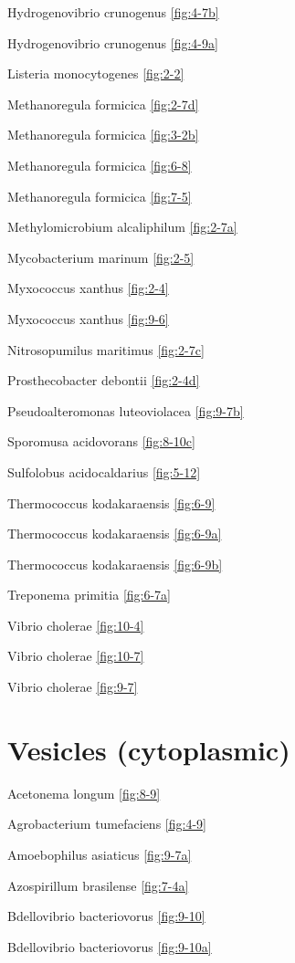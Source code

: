 \documentclass[]{tufte-book}
\begin{document}
Hydrogenovibrio crunogenus \ref{fig:4-7b}

Hydrogenovibrio crunogenus \ref{fig:4-9a}

Listeria monocytogenes \ref{fig:2-2}

Methanoregula formicica \ref{fig:2-7d}

Methanoregula formicica \ref{fig:3-2b}

Methanoregula formicica \ref{fig:6-8}

Methanoregula formicica \ref{fig:7-5}

Methylomicrobium alcaliphilum \ref{fig:2-7a}

Mycobacterium marinum \ref{fig:2-5}

Myxococcus xanthus \ref{fig:2-4}

Myxococcus xanthus \ref{fig:9-6}

Nitrosopumilus maritimus \ref{fig:2-7c}

Prosthecobacter debontii \ref{fig:2-4d}

Pseudoalteromonas luteoviolacea \ref{fig:9-7b}

Sporomusa acidovorans \ref{fig:8-10c}

Sulfolobus acidocaldarius \ref{fig:5-12}

Thermococcus kodakaraensis \ref{fig:6-9}

Thermococcus kodakaraensis \ref{fig:6-9a}

Thermococcus kodakaraensis \ref{fig:6-9b}

Treponema primitia \ref{fig:6-7a}

Vibrio cholerae \ref{fig:10-4}

Vibrio cholerae \ref{fig:10-7}

Vibrio cholerae \ref{fig:9-7}

\hypertarget{vesicles-cytoplasmic}{%
\section*{Vesicles (cytoplasmic)}\label{vesicles-cytoplasmic}}

Acetonema longum \ref{fig:8-9}

Agrobacterium tumefaciens \ref{fig:4-9}

Amoebophilus asiaticus \ref{fig:9-7a}

Azospirillum brasilense \ref{fig:7-4a}

Bdellovibrio bacteriovorus \ref{fig:9-10}

Bdellovibrio bacteriovorus \ref{fig:9-10a}
\end{document}
